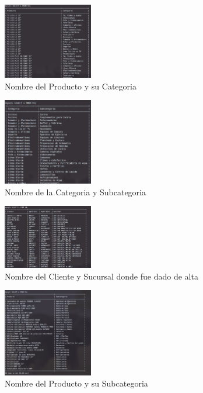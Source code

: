 \documentclass[12pt, fleqn]{article}                             %
\begin{document}
        \begin{figure}[ht!]
            \centering
            \includegraphics[width=0.35\textwidth]{BD5Reporte2}
            \caption{Nombre del Producto y su Categoria}
        \end{figure}


        \begin{figure}[ht!]
            \centering
            \includegraphics[width=0.35\textwidth]{BD5Reporte3}
            \caption{Nombre de la Categoria y Subcategoria}
        \end{figure}

        \begin{figure}[ht!]
            \centering
            \includegraphics[width=0.35\textwidth]{BD5Reporte4}
            \caption{Nombre del Cliente y Sucursal donde fue dado de alta}
        \end{figure}

        \begin{figure}[ht!]
            \centering
            \includegraphics[width=0.35\textwidth]{BD5Reporte5}
            \caption{Nombre del Producto y su Subcategoria}
        \end{figure}
\end{document}
